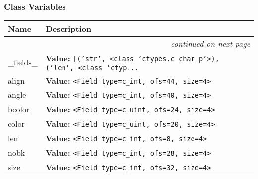 
  \subsubsection{Class Variables}

    \vspace{-1cm}
\hspace{\varindent}\begin{longtable}{|p{\varnamewidth}|p{\vardescrwidth}|l}
\cline{1-2}
\cline{1-2} \centering \textbf{Name} & \centering \textbf{Description}& \\
\cline{1-2}
\endhead\cline{1-2}\multicolumn{3}{r}{\small\textit{continued on next page}}\\\endfoot\cline{1-2}
\endlastfoot\raggedright \_\-f\-i\-e\-l\-d\-s\-\_\- & \raggedright \textbf{Value:} 
{\tt \texttt{[}\texttt{(}\texttt{'}\texttt{str}\texttt{'}\texttt{, }{\textless}class 'ctypes.c\_char\_p'{\textgreater}\texttt{)}\texttt{, }\texttt{(}\texttt{'}\texttt{len}\texttt{'}\texttt{, }{\textless}class 'ctyp\texttt{...}}&\\
\cline{1-2}
\raggedright a\-l\-i\-g\-n\- & \raggedright \textbf{Value:} 
{\tt {\textless}Field type=c\_int, ofs=44, size=4{\textgreater}}&\\
\cline{1-2}
\raggedright a\-n\-g\-l\-e\- & \raggedright \textbf{Value:} 
{\tt {\textless}Field type=c\_int, ofs=40, size=4{\textgreater}}&\\
\cline{1-2}
\raggedright b\-c\-o\-l\-o\-r\- & \raggedright \textbf{Value:} 
{\tt {\textless}Field type=c\_uint, ofs=24, size=4{\textgreater}}&\\
\cline{1-2}
\raggedright c\-o\-l\-o\-r\- & \raggedright \textbf{Value:} 
{\tt {\textless}Field type=c\_uint, ofs=20, size=4{\textgreater}}&\\
\cline{1-2}
\raggedright l\-e\-n\- & \raggedright \textbf{Value:} 
{\tt {\textless}Field type=c\_int, ofs=8, size=4{\textgreater}}&\\
\cline{1-2}
\raggedright n\-o\-b\-k\- & \raggedright \textbf{Value:} 
{\tt {\textless}Field type=c\_int, ofs=28, size=4{\textgreater}}&\\
\cline{1-2}
\raggedright s\-i\-z\-e\- & \raggedright \textbf{Value:} 
{\tt {\textless}Field type=c\_int, ofs=32, size=4{\textgreater}}&\\

\end{longtable}
